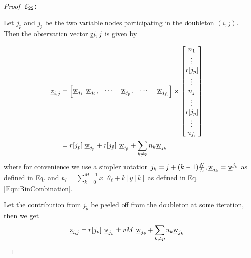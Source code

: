\begin{proof}

{\bf $\mathcal{E}_{22}$:}

Let $j_p$ and $j_{\tilde{p}}$ be the two variable nodes participating in the doubleton $(i,j)$. Then the observation vector $\underline{\mathrm{z}}{i,j}$ is given by 

\begin{align*}
\underline{z}_{i,j} &= \begin{bmatrix}
\wv_{j_{1}},\wv_{j_2}, & \cdots   & \wv_{j_p}, &\cdots \ &\wv_{j_{f_i}}
\end{bmatrix} \times
\begin{bmatrix}
n_{1} \\
\vdots \\
r[j_p]\\
\vdots\\
n_{j} \\
\vdots\\
r[j_{\tilde{p}}]\\
\vdots\\
n_{f_i}\\
\end{bmatrix}\\
&= r[j_p] ~ \wv_{j_p} + r[j_{\tilde{p}}] ~ \wv_{j_{\tilde{p}}} + \sum_{k \neq p}n_k \wv_{j_k} \\
\end{align*}
where for convenience we use a simpler notation $j_k=j+(k-1)\frac{N}{f_i}, \underline{\mathrm{w}}_{j_k}=\underline{\mathrm{w}}^{j_k}$ as defined in Eq. and $n_{l}=\sum\limits_{k=0}^{M-1}x[\theta_{\ell}+k]y[k]$ as defined in Eq. \eqref{Eqn:BinCombination}.

Let the contribution from $j_{\tilde{p}}$ be peeled off from the doubleton at some iteration, then we get
\[ \underline{\mathrm{z}}_{i,j} = r[j_p] ~ \underline{\mathrm{w}}_{j_p} \pm \eta M ~ \underline{\mathrm{w}}_{j_{\tilde{p}}} + \sum_{k \neq p}n_k \underline{\mathrm{w}}_{j_k}\]


\end{proof}
